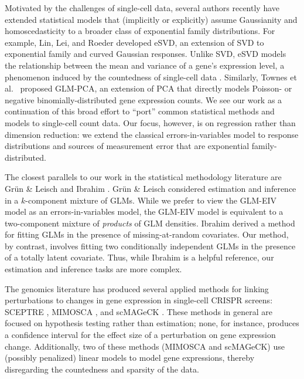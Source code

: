 \documentclass[12pt]{article}
\begin{document}
Motivated by the challenges of single-cell data, several authors recently have extended statistical models that (implicitly or explicitly) assume Gaussianity and homoscedasticity to a broader class of exponential family distributions. For example, Lin, Lei, and Roeder \cite{Lin2021} developed eSVD, an extension of SVD to exponential family and curved Gaussian responses. Unlike SVD, eSVD models the relationship between the mean and variance of a gene's expression level, a phenomenon induced by the countedness of single-cell data \cite{Lause2021}.
Similarly, Townes et al.\ \cite{Townes2019} proposed GLM-PCA, an extension of PCA that directly models Poisson- or negative binomially-distributed gene expression counts. We see our work as a continuation of this broad effort to ``port'' common statistical methods and models to single-cell count data. Our focus, however, is on regression rather than dimension reduction: we extend the classical errors-in-variables model to response distributions and sources of measurement error that are exponential family-distributed.


The closest parallels to our work in the statistical methodology literature are Gr\"{u}n \& Leisch \cite{Grun2008} and Ibrahim \cite{Ibrahim1990}. Gr\"{u}n \& Leisch considered estimation and inference in a $k$-component mixture of GLMs. While we prefer to view the GLM-EIV model as an errors-in-variables model,  the GLM-EIV model is equivalent to a two-component mixture of \textit{products} of GLM densities. Ibrahim derived a method for fitting GLMs in the presence of missing-at-random covariates. Our method, by contrast, involves fitting two conditionally independent GLMs in the presence of a totally latent covariate. Thus, while Ibrahim is a helpful reference, our estimation and inference tasks are more complex.

The genomics literature has produced several applied methods for linking perturbations to changes in gene expression in single-cell CRISPR screens: SCEPTRE \cite{Barry2020}, MIMOSCA \cite{Dixit2016}, and scMAGeCK \cite{Yang2019}. These methods in general are focused on hypothesis testing rather than estimation; none, for instance, produces a confidence interval for the effect size of a perturbation on gene expression change. Additionally, two of these methods (MIMOSCA and scMAGeCK) use (possibly penalized) linear models to model gene expressions, thereby disregarding the countedness and sparsity of the data. 
\end{document}
